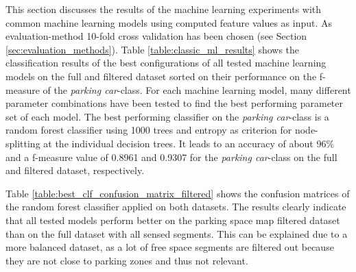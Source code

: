 This section discusses the results of the machine learning experiments with common machine learning models using computed feature values as input. As evaluation-method 10-fold cross validation has been chosen (see Section \ref{sec:evaluation_methods}). 
Table \ref{table:classic_ml_results} shows the classification results of the best configurations of all tested machine learning models on the full and filtered dataset sorted on their performance on the f-measure of the \emph{parking car}-class. For each machine learning model, many different parameter combinations have been tested to find the best performing parameter set of each model. The best performing classifier on the \emph{parking car}-class is a random forest classifier using 1000 trees and entropy as criterion for node-splitting at the individual decision trees. It leads to an accuracy of about 96\% and a f-measure value of 0.8961 and 0.9307 for the \emph{parking car}-class on the full and filtered dataset, respectively. 

Table \ref{table:best_clf_confusion_matrix_filtered} shows the confusion matrices of the random forest classifier applied on both datasets. The results clearly indicate that all tested models perform better on the parking space map filtered dataset than on the full dataset with all sensed segments. This can be explained due to a more balanced dataset, as a lot of free space segments are filtered out because they are not close to parking zones and thus not relevant.


